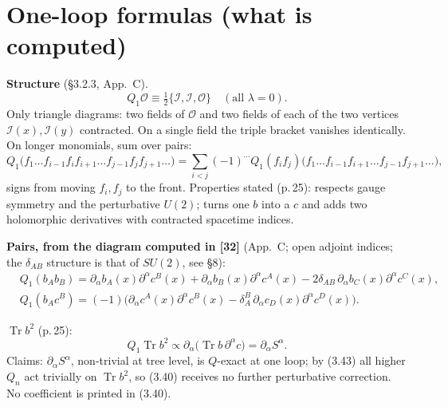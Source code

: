 \documentclass[11pt]{article}
\newcommand{\Tr}{\operatorname{Tr}}
\newcommand{\cI}{\mathcal{I}}
\newcommand{\cO}{\mathcal{O}}
\begin{document}
\section{One-loop formulas (what is computed)}

\textbf{Structure} (§3.2.3, App.~C).
\begin{equation}
Q_1\cO\equiv\tfrac12\{\cI,\cI,\cO\}\quad(\text{all }\lambda=0). \tag{C.1}
\end{equation}
Only triangle diagrams: two fields of $\cO$ and two fields of each of the two vertices $\cI(x),\cI(y)$ contracted. On a single field the triple bracket vanishes identically. On longer monomials, sum over pairs:
\begin{equation}
Q_1\big(f_1\dots f_{i-1}f_if_{i+1}\dots f_{j-1}f_jf_{j+1}\dots\big)=\sum_{i<j}(-1)^{\cdots}Q_1(f_if_j)\big(f_1\dots f_{i-1}f_{i+1}\dots f_{j-1}f_{j+1}\dots\big), \tag{C.2}
\end{equation}
signs from moving $f_i,f_j$ to the front. Properties stated (p.\,25): respects gauge symmetry and the perturbative $U(2)$; turns one $b$ into a $c$ and adds two holomorphic derivatives with contracted spacetime indices.

\textbf{Pairs, from the diagram computed in [32]} (App.~C; open adjoint indices; the $\delta_{AB}$ structure is that of $SU(2)$, see §8):
\begin{align}
&Q_1(b_Ab_B)=\partial_\alpha b_A(x)\partial^\alpha c^B(x)+\partial_\alpha b_B(x)\partial^\alpha c^A(x)-2\delta_{AB}\,\partial_\alpha b_C(x)\partial^\alpha c^C(x), \tag{C.3}\\
&Q_1(b_Ac^B)=(-1)\Big(\partial_\alpha c^A(x)\partial^\alpha c^B(x)-\delta^B_A\,\partial_\alpha c_D(x)\partial^\alpha c^D(x)\Big). \tag{C.4}
\end{align}

\textbf{$\Tr b^2$} (p.\,25):
\begin{equation}
Q_1\Tr b^2\propto\partial_\alpha\big(\Tr b\,\partial^\alpha c\big)=\partial_\alpha S^\alpha . \tag{3.40}
\end{equation}
Claims: $\partial_\alpha S^\alpha$, non-trivial at tree level, is $Q$-exact at one loop; by (3.43) all higher $Q_n$ act trivially on $\Tr b^2$, so (3.40) receives no further perturbative correction. No coefficient is printed in (3.40).
\end{document}
